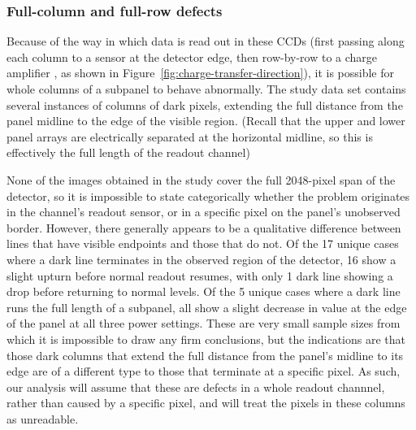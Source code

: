 \documentclass[\main/IO-Pixels.tex]{subfiles}
\begin{document}
\subsubsection{Full-column and full-row defects}

Because of the way in which data is read out in these CCDs (first passing along each column to a sensor at the detector edge, then row-by-row to a charge amplifier , as shown in Figure~\ref{fig:charge-transfer-direction}), it is possible for whole columns of a subpanel to behave abnormally. The study data set contains several instances of columns of dark pixels, extending the full distance from the panel midline to the edge of the visible region. (Recall that the upper and lower panel arrays are electrically separated at the horizontal midline, so this is effectively the full length of the readout channel)

None of the images obtained in the study cover the full 2048-pixel span of the detector, so it is impossible to state categorically whether the problem originates in the channel's readout sensor, or in a specific pixel on the panel's unobserved border. However, there generally appears to be a qualitative difference between lines that have visible endpoints and those that do not. Of the 17 unique cases where a dark line terminates in the observed region of the detector, 16 show a slight upturn before normal readout resumes, with only 1 dark line showing a drop before returning to normal levels. Of the 5 unique cases where a dark line runs the full length of a subpanel, all show a slight decrease in value at the edge of the panel at all three power settings. These are very small sample sizes from which it is impossible to draw any firm conclusions, but the indications are that those dark columns that extend the full distance from the panel's midline to its edge are of a different type to those that terminate at a specific pixel. As such, our analysis will assume that these are defects in a whole readout channnel, rather than caused by a specific pixel, and will treat the pixels in these columns as unreadable.
\end{document}
